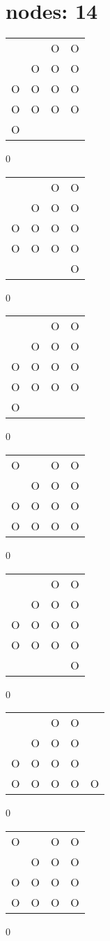 \section{nodes: 14}
\begin{tabular}{|m{0.2cm}m{0.2cm}m{0.2cm}m{0.2cm}|}\hline
 & &O&O\\
 &O&O&O\\
O&O&O&O\\
O&O&O&O\\
O& & & \\
\hline\end{tabular}0
\begin{tabular}{|m{0.2cm}m{0.2cm}m{0.2cm}m{0.2cm}|}\hline
 & &O&O\\
 &O&O&O\\
O&O&O&O\\
O&O&O&O\\
 & & &O\\
\hline\end{tabular}0
\begin{tabular}{|m{0.2cm}m{0.2cm}m{0.2cm}m{0.2cm}|}\hline
 & &O&O\\
 &O&O&O\\
O&O&O&O\\
O&O&O&O\\
O& & & \\
\hline\end{tabular}0
\begin{tabular}{|m{0.2cm}m{0.2cm}m{0.2cm}m{0.2cm}|}\hline
O& &O&O\\
 &O&O&O\\
O&O&O&O\\
O&O&O&O\\
\hline\end{tabular}0
\begin{tabular}{|m{0.2cm}m{0.2cm}m{0.2cm}m{0.2cm}|}\hline
 & &O&O\\
 &O&O&O\\
O&O&O&O\\
O&O&O&O\\
 & & &O\\
\hline\end{tabular}0
\begin{tabular}{|m{0.2cm}m{0.2cm}m{0.2cm}m{0.2cm}m{0.2cm}|}\hline
 & &O&O& \\
 &O&O&O& \\
O&O&O&O& \\
O&O&O&O&O\\
\hline\end{tabular}0
\begin{tabular}{|m{0.2cm}m{0.2cm}m{0.2cm}m{0.2cm}|}\hline
O& &O&O\\
 &O&O&O\\
O&O&O&O\\
O&O&O&O\\
\hline\end{tabular}0
